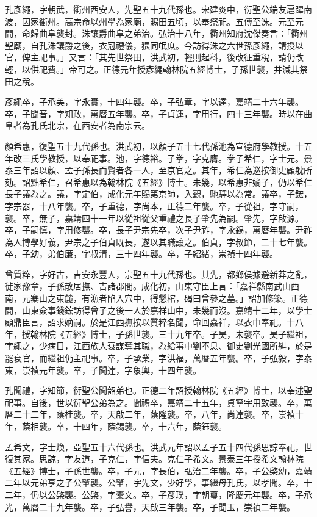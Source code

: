 \begin{pinyinscope}
孔彥繩，字朝武，衢州西安人，先聖五十九代孫也。宋建炎中，衍聖公端友扈蹕南渡，因家衢州。高宗命以州學為家廟，賜田五頃，以奉祭祀。五傳至洙。元至元間，命歸曲阜襲封。洙讓爵曲阜之弟治。弘治十八年，衢州知府沈傑奏言：「衢州聖廟，自孔洙讓爵之後，衣冠禮儀，猥同氓庶。今訪得洙之六世孫彥繩，請授以官，俾主祀事。」又言：「其先世祭田，洪武初，輕則起科，後改征重稅，請仍改輕，以供祀費。」帝可之。正德元年授彥繩翰林院五經博士，子孫世襲，并減其祭田之稅。

彥繩卒，子承美，字永實，十四年襲。卒，子弘章，字以達，嘉靖二十六年襲。卒，子聞音，字知政，萬曆五年襲。卒，子貞運，字用行，四十三年襲。時以在曲阜者為孔氏北宗，在西安者為南宗云。

顏希惠，復聖五十九代孫也。洪武初，以顏子五十七代孫池為宣德府學教授。十五年改三氏學教授，以奉祀事。池，字德裕。子拳，字克膺。拳子希仁，字士元。景泰三年詔以顏、孟子孫長而賢者各一人，至京官之。其年，希仁為巡按御史顧躭所劾。詔黜希仁，召希惠以為翰林院《五經》博士。未幾，以希惠非嫡子，仍以希仁長子議為之。議，字定伯，成化元年賜第京師，入覲，馳驛以為常。議卒，子鋐，字宗器，十八年襲。卒，子重德，字尚本，正德二年襲。卒，子從祖，字守嗣，襲。卒，無子，嘉靖四十一年以從祖從父重禮之長子肇先為嗣。肇先，字啟源。卒，子嗣慎，字用修襲。卒，長子尹宗先卒，次子尹祚，字永錫，萬曆年襲。尹祚為人博學好義，尹宗之子伯貞既長，遂以其職讓之。伯貞，字叔節，二十七年襲。卒，子幼，弟伯廉，字叔清，三十四年襲。卒，子紹緒，崇禎十四年襲。

曾質粹，字好古，吉安永豐人，宗聖五十九代孫也。其先，都鄉侯據避新莽之亂，徙家豫章，子孫散居撫、吉諸郡間。成化初，山東守臣上言：「嘉祥縣南武山西南，元寨山之東麓，有漁者陷入穴中，得懸棺，碣曰曾參之墓。」詔加修築。正德間，山東僉事錢鋐訪得曾子之後一人於嘉祥山中，未幾而沒。嘉靖十二年，以學士顧鼎臣言，詔求嫡嗣。於是江西撫按以質粹名聞，命回嘉祥，以衣巾奉祀。十八年，授翰林院《五經》博士，子孫世襲。三十九年卒。子昊，未襲卒。昊子繼祖，字繩之，少病目，江西族人袞謀奪其職，為給事中劉不息、御史劉光國所糾，於是罷袞官，而繼祖仍主祀事。卒，子承業，字洪福，萬曆五年襲。卒，子弘毅，字泰東，崇禎元年襲。卒，子聞達，字象輿，十四年襲。

孔聞禮，字知節，衍聖公聞韶弟也。正德二年詔授翰林院《五經》博士，以奉述聖祀事。自後，世以衍聖公弟為之。聞禮卒，嘉靖二十五年，貞寧字用致襲。卒，萬曆二十二年，蔭桂襲。卒，天啟二年，蔭隆襲。卒，八年，尚達襲。卒，崇禎十年，蔭相襲。卒，十四年，蔭錫襲。卒，十六年，蔭鈺襲。

孟希文，字士煥，亞聖五十六代孫也。洪武元年詔以孟子五十四代孫思諒奉祀，世復其家。思諒，字友道，子克仁，字信夫。克仁子希文。景泰三年授希文翰林院《五經》博士，子孫世襲。卒，子元，字長伯，弘治二年襲。卒，子公棨幼，嘉靖二年以元弟亨之子公肇襲。公肇，字先文，少好學，事繼母孔氏，以孝聞。卒，十二年，仍以公棨襲。公棨，字橐文。卒，子彥璞，字朝璽，隆慶元年襲。卒，子承光，萬曆二十九年襲。卒，子弘譽，天啟三年襲。卒，子聞玉，崇禎二年襲。


\end{pinyinscope}
